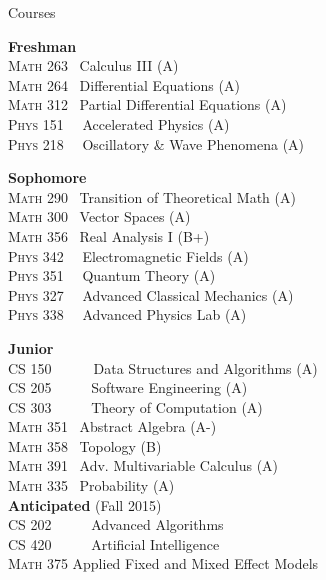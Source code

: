 \documentclass{resume} %
\begin{document}
\begin{rSection}{Courses}


\setlength{\columnsep}{1cm}
\begin{multicols}{2}

\textbf{Freshman}\\
\textsc{Math 263} 	 \	Calculus III (A)\\
\textsc{Math 264} 	 \	Differential Equations (A)\\
\textsc{Math 312} 	 \	Partial Differential Equations (A)\\
\textsc{Phys 151} \  \	Accelerated Physics (A)\\
\textsc{Phys 218} \  \	Oscillatory \& Wave Phenomena (A)

\textbf{Sophomore}\\
\textsc{Math 290} 	 \	Transition of Theoretical Math (A)\\
\textsc{Math 300} 	 \	Vector Spaces (A)\\
\textsc{Math 356} 	 \	Real Analysis I (B+)\\
\textsc{Phys 342} \	 \	Electromagnetic Fields (A)\\
\textsc{Phys 351} \	 \	Quantum Theory (A)\\
\textsc{Phys 327} \	 \	Advanced Classical Mechanics (A)\\
\textsc{Phys 338} \	 \	Advanced Physics Lab (A)

\textbf{Junior}\\
\textsc{CS 150}\ \ \ \ \	 \	Data Structures and Algorithms (A)\\
\textsc{CS 205} \ \ \ \	 \	Software Engineering (A)\\
\textsc{CS 303} \ \ \ \	 \	Theory of Computation (A)\\
\textsc{Math 351} 		 \	Abstract Algebra (A-)\\
\textsc{Math 358} 		 \	Topology (B)\\
\textsc{Math 391} 		 \	Adv. Multivariable Calculus (A)\\
\textsc{Math 335} 		 \	Probability (A)\\

\textbf{Anticipated} (Fall 2015)\\
\textsc{CS 202} \ \ \ \	 \	Advanced Algorithms\\
\textsc{CS 420} \ \ \ \	 \	Artificial Intelligence\\
\textsc{Math 375} 		 Applied Fixed and Mixed Effect Models\\


\end{multicols}

\end{rSection}
\end{document}
